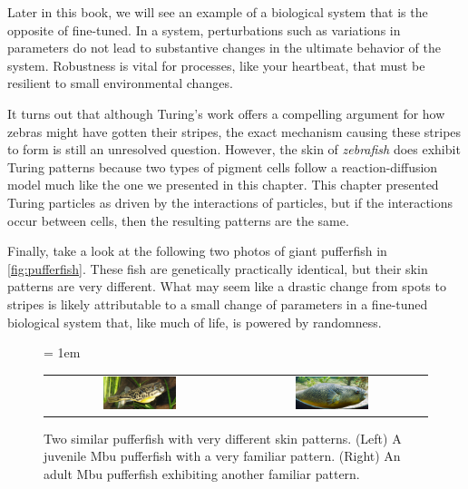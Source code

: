 Later in this book, we will see an example of a biological system that is the opposite of fine-tuned. In a  system, perturbations such as variations in parameters do not lead to substantive changes in the ultimate behavior of the system. Robustness is vital for processes, like your heartbeat, that must be resilient to small environmental changes.

It turns out that although Turing's work offers a compelling argument for how zebras might have gotten their stripes, the exact mechanism causing these stripes to form is still an unresolved question. However, the skin of \textit{zebrafish} does exhibit Turing patterns because two types of pigment cells follow a reaction-diffusion model much like the one we presented in this chapter. This chapter presented Turing particles as driven by the interactions of particles, but if the interactions occur between cells, then the resulting patterns are the same.

Finally, take a look at the following two photos of giant pufferfish in \autoref{fig:pufferfish}. These fish are genetically practically identical, but their skin patterns are very different. What may seem like a drastic change from spots to stripes is likely attributable to a small change of parameters in a fine-tuned biological system that, like much of life, is powered by randomness.\\

\begin{figure}[h]
\centering
\mySfFamily
\tabcolsep = 1em
\begin{tabular}{c c}
\includegraphics[width = 0.4\textwidth]{../images/Juvenile_Mbu_pufferfish.jpg} & \includegraphics[width = 0.4\textwidth]{../images/Giant_Puffer_fish_skin_pattern.jpg}
\end{tabular}
\caption{Two similar pufferfish with very different skin patterns. (Left) A juvenile Mbu pufferfish with a very familiar pattern. (Right) An adult Mbu pufferfish exhibiting another familiar pattern.}
\label{fig:pufferfish}
\end{figure}
